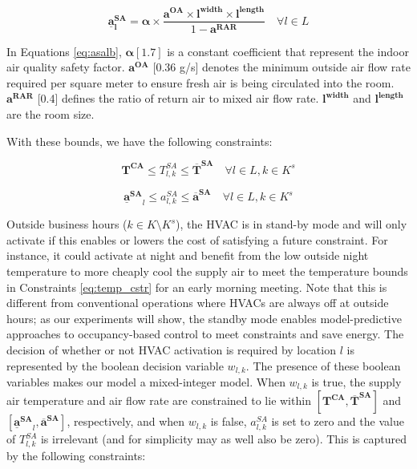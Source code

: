 \begin{equation} \label{eq:asalb}
\bm{\underline{a}_{l}^{SA}} = \bm{\alpha} \times \frac{\bm{a^{OA}} \times \bm{l^{width}} \times \bm{l^{length}}}{1-\bm{a^{RAR}}} \quad \forall l\in L
\end{equation}

\noindent In Equations \eqref{eq:asalb}, $\bm \alpha [1.7]$ is a constant coefficient that represent the indoor air quality safety factor. $\bm{a^{OA}}$ [0.36 g/s] denotes the minimum outside air flow rate required per square meter to ensure fresh air is being circulated into the room. $\bm{a^{RAR}}$ [0.4] defines the ratio of return air to mixed air flow rate. $\bm{l^{width}}$ and $\bm{l^{length}}$ are the room size. 

With these bounds, we have the following constraints:


\begin{equation} \label{eq:hvac_active_TSA}
\bm{T^{CA}} \leq T_{l,k}^{SA} \leq \bm{\overline{T}^{SA}}  \quad \forall l \in L, k\in K^s
\end{equation}

\begin{equation} \label{eq:hvac_active_ASA}
\bm{\underline{a}^{SA}}_{l} \leq a_{l,k}^{SA}  \leq \bm{\overline{a}^{SA}}   \quad \forall l \in L, k\in K^s
\end{equation}

Outside business hours ($k\in K\setminus K^s$), the HVAC is in stand-by mode and will only activate if this enables or lowers the
cost of satisfying a future constraint. For instance, it could activate at night and benefit from the low outside night temperature
to more cheaply cool the supply air to meet the temperature bounds in Constraints \eqref{eq:temp_cstr} for an early morning meeting. Note that this is different from conventional operations where HVACs are always off at outside hours; as our experiments will show, the standby mode enables model-predictive approaches to occupancy-based control to meet constraints and save energy. The decision of whether or not HVAC
activation is required by location $l$ is represented by the boolean decision variable $w_{l,k}$. The presence of these boolean variables
makes our model a mixed-integer model. When $w_{l,k}$ is true, the supply air temperature and air flow rate are constrained to lie within
$[\bm{T^{CA}}, \bm{\overline{T}^{SA}}]$ and $[\bm{\underline{a}^{SA}}_{l},\bm{\overline{a}^{SA}}]$, respectively, and when $w_{l,k}$ is false, $a_{l,k}^{SA}$ is set to zero and the value of $T_{l,k}^{SA}$ is irrelevant (and for simplicity may as well also be zero). This is captured by the following
constraints:

